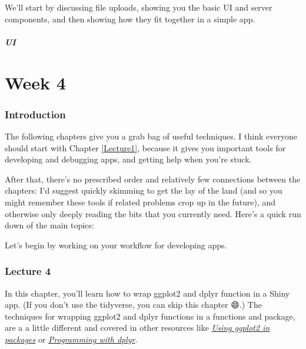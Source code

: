 \documentclass[
]{article}
\begin{document}
We'll start by discussing file uploads, showing you the basic UI and server components, and then showing how they fit together in a simple app.

\hypertarget{ui}{%
\subsubsection{UI}\label{ui}}

\hypertarget{part-week-4}{%
\part*{Week 4}\label{part-week-4}}

\hypertarget{week4-intro}{%
\section*{Introduction}\label{week4-intro}}

The following chapters give you a grab bag of useful techniques.
I think everyone should start with Chapter \ref{Lecture1}, because it gives you important tools for developing and debugging apps, and getting help when you're stuck.

After that, there's no prescribed order and relatively few connections between the chapters: I'd suggest quickly skimming to get the lay of the land (and so you might remember these tools if related problems crop up in the future), and otherwise only deeply reading the bits that you currently need.
Here's a quick run down of the main topics:

Let's begin by working on your workflow for developing apps.

\hypertarget{lecture4}{%
\section{Lecture 4}\label{lecture4}}

In this chapter, you'll learn how to wrap ggplot2 and dplyr function in a Shiny app.
(If you don't use the tidyverse, you can skip this chapter 😄.) The techniques for wrapping ggplot2 and dplyr functions in a functions and package, are a a little different and covered in other resources like \href{http://ggplot2.tidyverse.org/dev/articles/ggplot2-in-packages.html}{\emph{Using ggplot2 in packages}} or \href{http://dplyr.tidyverse.org/articles/programming.html}{\emph{Programming with dplyr}}.
\end{document}
